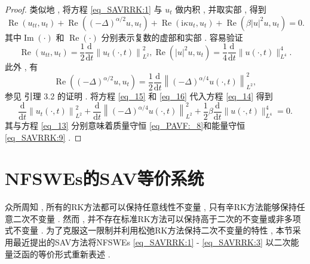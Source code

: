 \begin{proof}
类似地 , 将方程 \eqref{eq_SAVRRK:1} 与 $u_{t}$ 做内积 , 并取实部 , 得到
\begin{equation}
\operatorname{Re}\left(u_{t t} , u_{t}\right)+\operatorname{Re}\left((-\Delta)^{\alpha / 2} u , u_{t}\right)+\operatorname{Re}\left(\mathrm{i} \kappa u_{t} , u_{t}\right)+\operatorname{Re}\left(\beta|u|^{2} u , u_{t}\right)=0  . 
\label{eq_14}\end{equation}
其中$\operatorname{Im}(\cdot)$ 和 $\operatorname{Re}(\cdot)$ 分别表示复数的虚部和实部 . 容易验证
\begin{equation}
\operatorname{Re}\left(u_{t t} , u_{t}\right)=\frac{1}{2} \frac{\mathrm{d}}{\mathrm{d} t}\left\|u_{t}(\cdot , t)\right\|_{L^{2}}^{2} , \operatorname{Re}\left(|u|^{2} u , u_{t}\right)=\frac{1}{4} \frac{\mathrm{d}}{\mathrm{d} t}\|u(\cdot , t)\|_{L^{4}}^{4}  . 
\label{eq_15}\end{equation}
此外 , 有
\begin{equation}
\operatorname{Re}\left((-\Delta)^{\alpha / 2} u , u_{t}\right)=\frac{1}{2} \frac{\mathrm{d}}{\mathrm{d} t}\left\|(-\Delta)^{\alpha / 4} u(\cdot , t)\right\|_{L^{2}}^{2} , 
\label{eq_16}\end{equation}
参见 \citep{guoExistenceGlobalSmooth2008} 引理 3.2 的证明 . 
将方程 \eqref{eq_15} 和 \eqref{eq_16} 代入方程 \eqref{eq_14} 得到
\begin{equation}
\frac{\mathrm{d}}{\mathrm{d} t}\left\|u_{t}(\cdot , t)\right\|_{L^{2}}^{2}+\frac{\mathrm{d}}{\mathrm{d} t}\left\|(-\Delta)^{\alpha / 4} u(\cdot , t)\right\|_{L^{2}}^{2}+\frac{1}{2} \beta \frac{\mathrm{d}}{\mathrm{d} t}\|u(\cdot , t)\|_{L^{4}}^{4}=0  . 
\label{eq_17}\end{equation}
其与方程 \eqref{eq_13} 分别意味着质量守恒 \eqref{eq_PAVF:_8}和能量守恒 \eqref{eq_SAVRRK:9} . 

\end{proof}

\section{NFSWEs的SAV等价系统}\label{Section_SAVRRK: 2}

众所周知 , 所有的RK方法都可以保持任意线性不变量 , 只有辛RK方法能够保持任意二次不变量 . 
然而 , 并不存在标准RK方法可以保持高于二次的不变量或非多项式不变量 . 
为了克服这一限制并利用松弛RK方法保持二次不变量的特性 , 本节采用最近提出的SAV方法将NFSWEs \eqref{eq_SAVRRK:1} - \eqref{eq_SAVRRK:3} 以二次能量泛函的等价形式重新表述 . 

